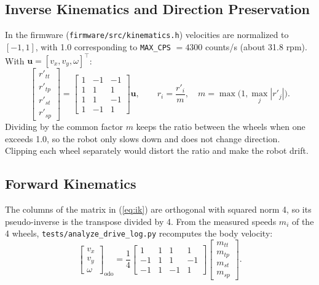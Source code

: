\documentclass[11pt,a4paper]{article}
\newcommand{\code}[1]{\texttt{\small #1}}
\begin{document}
\subsection{Inverse Kinematics and Direction Preservation}
In the firmware (\code{firmware/src/kinematics.h}) velocities are normalized to $[-1,1]$, with 1.0 corresponding to \code{MAX\_CPS} $=4300$ counts/s (about 31.8 rpm). With $\mathbf u=[v_x,v_y,\omega]^\top$:
\begin{equation}
\begin{bmatrix}r'_{tt}\\r'_{tp}\\r'_{st}\\r'_{sp}\end{bmatrix}=
\begin{bmatrix}1&-1&-1\\1&1&1\\1&1&-1\\1&-1&1\end{bmatrix}\mathbf u,\qquad
r_i=\frac{r'_i}{m},\quad m=\max\bigl(1,\max_j|r'_j|\bigr).
\label{eq:ik}
\end{equation}
Dividing by the common factor $m$ keeps the ratio between the wheels when one exceeds 1.0, so the robot only slows down and does not change direction. Clipping each wheel separately would distort the ratio and make the robot drift.

\subsection{Forward Kinematics}
The columns of the matrix in (\ref{eq:ik}) are orthogonal with squared norm 4, so its pseudo-inverse is the transpose divided by 4. From the measured speeds $m_i$ of the 4 wheels, \code{tests/analyze\_drive\_log.py} recomputes the body velocity:
\begin{equation}
\begin{bmatrix}v_x\\v_y\\\omega\end{bmatrix}_{\text{odo}}=\frac14
\begin{bmatrix}1&1&1&1\\-1&1&1&-1\\-1&1&-1&1\end{bmatrix}
\begin{bmatrix}m_{tt}\\m_{tp}\\m_{st}\\m_{sp}\end{bmatrix}.
\label{eq:fk}
\end{equation}
\end{document}
